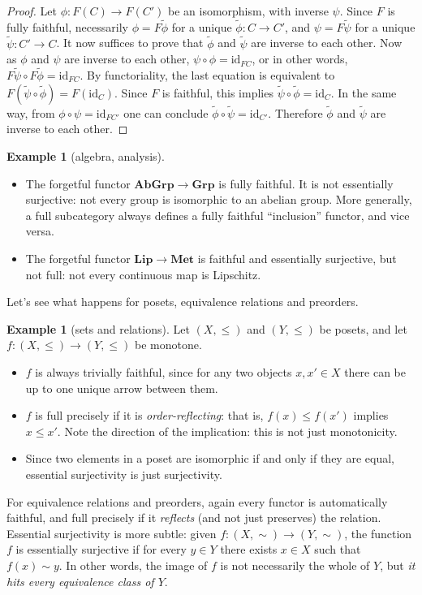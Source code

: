 \documentclass[12pt,oneside]{scrbook}
\numberwithin{equation}{section}
\theoremstyle{plain}
\theoremstyle{definition}
\newtheorem{eg}[thm]{Example}
\newcommand{\cat}[1]{{\mathbf{#1}}} %
\newcommand{\Grp}{\cat{Grp}}
\DeclareMathOperator{\1}{\mathbbm{1}}
\DeclareMathOperator{\2}{\mathbbm{2}}
\newcommand{\id}{\mathrm{id}} %
\begin{document}
\begin{proof}
 Let $\phi:F(C)\to F(C')$ be an isomorphism, with inverse $\psi$. Since $F$ is fully faithful, necessarily $\phi=F\tilde{\phi}$ for a unique $\tilde{\phi}:C\to C'$, and $\psi=F\tilde{\psi}$ for a unique $\tilde{\psi}:C'\to C$. It now suffices to prove that $\tilde{\phi}$ and $\tilde{\psi}$ are inverse to each other. Now as $\phi$ and $\psi$ are inverse to each other, $\psi\circ\phi=\id_{FC}$, or in other words, $F\tilde{\psi}\circ F\tilde{\phi}=\id_{FC}$. By functoriality, the last equation is equivalent to $F(\tilde{\psi}\circ \tilde{\phi})=F(\id_C)$. Since $F$ is faithful, this implies $\tilde{\psi}\circ \tilde{\phi}=\id_C$. In the same way, from $\phi\circ\psi=\id_{FC'}$ one can conclude $\tilde{\phi}\circ \tilde{\psi}=\id_{C'}$. Therefore $\tilde{\phi}$ and $\tilde{\psi}$ are inverse to each other.
\end{proof}


\begin{eg}[algebra, analysis]
\phantom{.}
 \begin{itemize}
  \item The forgetful functor $\cat{AbGrp}\to\Grp$ is fully faithful. It is not essentially surjective: not every group is isomorphic to an abelian group.
  More generally, a full subcategory always defines a fully faithful ``inclusion'' functor, and vice versa. 
  \item The forgetful functor $\cat{Lip}\to\cat{Met}$ is faithful and essentially surjective, but not full: not every continuous map is Lipschitz. 
 \end{itemize}
\end{eg}

Let's see what happens for posets, equivalence relations and preorders.

\begin{eg}[sets and relations]
 Let $(X,\le)$ and $(Y,\le)$ be posets, and let $f:(X,\le)\to (Y,\le)$ be monotone. 
 \begin{itemize}
  \item $f$ is always trivially faithful, since for any two objects $x,x'\in X$ there can be up to one unique arrow between them.
  \item $f$ is full precisely if it is \emph{order-reflecting}: that is, $f(x)\le f(x')$ implies $x\le x'$. Note the direction of the implication: this is not just monotonicity. 
  \item Since two elements in a poset are isomorphic if and only if they are equal, essential surjectivity is just surjectivity.
 \end{itemize}

 For equivalence relations and preorders, again every functor is automatically faithful, and full precisely if it \emph{reflects} (and not just preserves) the relation. Essential surjectivity is more subtle: given $f:(X,\sim)\to (Y,\sim)$, the function $f$ is essentially surjective if for every $y\in Y$ there exists $x\in X$ such that $f(x)\sim y$. In other words, the image of $f$ is not necessarily the whole of $Y$, but \emph{it hits every equivalence class of $Y$}. 
\end{eg}
\end{document}
